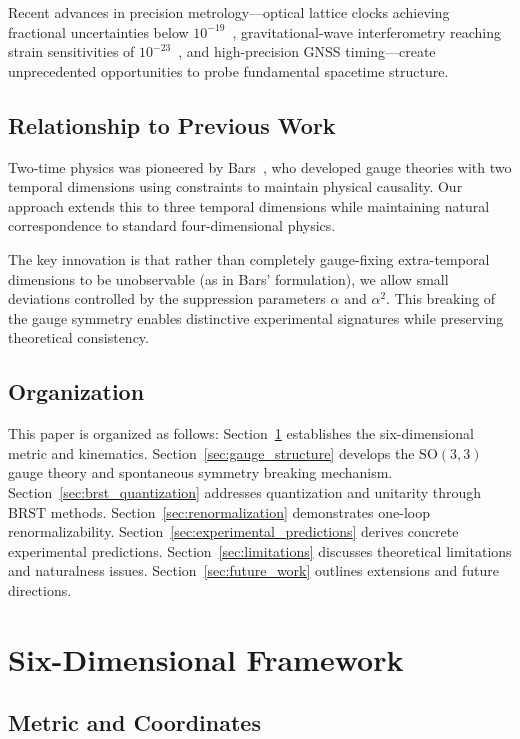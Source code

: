 \documentclass[12pt,a4paper]{article}
\newcommand{\SO}{\text{SO}}
\newcommand{\BRST}{\text{BRST}}
\begin{document}
Recent advances in precision metrology—optical lattice clocks achieving fractional uncertainties below $10^{-19}$~\cite{huntemann2016,brewer2019}, gravitational-wave interferometry reaching strain sensitivities of $10^{-23}$~\cite{abbott2016}, and high-precision GNSS timing—create unprecedented opportunities to probe fundamental spacetime structure.

\subsection{Relationship to Previous Work}

Two-time physics was pioneered by Bars~\cite{bars2000,bars2001}, who developed gauge theories with two temporal dimensions using constraints to maintain physical causality. Our approach extends this to three temporal dimensions while maintaining natural correspondence to standard four-dimensional physics.

The key innovation is that rather than completely gauge-fixing extra-temporal dimensions to be unobservable (as in Bars' formulation), we allow small deviations controlled by the suppression parameters $\alpha$ and $\alpha^2$. This breaking of the gauge symmetry enables distinctive experimental signatures while preserving theoretical consistency.

\subsection{Organization}

This paper is organized as follows: Section~\ref{sec:6d_framework} establishes the six-dimensional metric and kinematics. Section~\ref{sec:gauge_structure} develops the $\SO(3,3)$ gauge theory and spontaneous symmetry breaking mechanism. Section~\ref{sec:brst_quantization} addresses quantization and unitarity through $\BRST$ methods. Section~\ref{sec:renormalization} demonstrates one-loop renormalizability. Section~\ref{sec:experimental_predictions} derives concrete experimental predictions. Section~\ref{sec:limitations} discusses theoretical limitations and naturalness issues. Section~\ref{sec:future_work} outlines extensions and future directions.

\section{Six-Dimensional Framework}
\label{sec:6d_framework}

\subsection{Metric and Coordinates}
\end{document}
